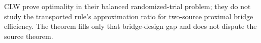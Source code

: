 CLW prove optimality in their balanced randomized-trial problem; they do not study the transported rule's approximation ratio for two-source proximal bridge efficiency. The theorem fills only that bridge-design gap and does not dispute the source theorem.